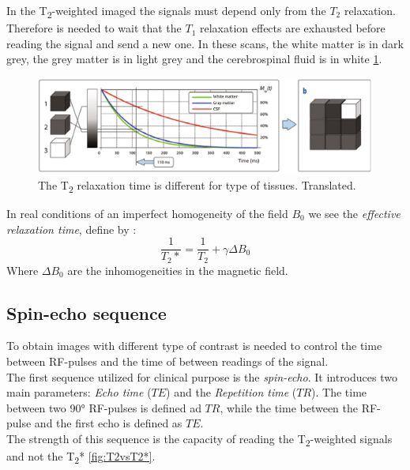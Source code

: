  In the T\textsubscript{2}-weighted imaged the signals must depend only from the $T_2$ relaxation. Therefore is needed to wait that the $T_1$ relaxation effects are exhausted before reading the signal and send a new one. In these scans, the white matter is in dark grey, the grey matter is in light grey and the cerebrospinal fluid is in white \ref{fig:T2_relax_tissues}.

 \begin{figure}[h]
    \centering
    \includegraphics[width=1\textwidth]{images/t2_relax_tissues.png}
    \caption{The T\textsubscript{2} relaxation time is different for type of tissues. \cite{elementiRisonanza} Translated.}
    \label{fig:T2_relax_tissues}
 \end{figure}

 \noindent In real conditions of an imperfect homogeneity of the field $B_0$ we see the \emph{effective relaxation time}, define by \cite{slides}:
 \begin{equation}
    \frac{1}{T_{2}*} = \frac{1}{T_2}+\gamma\Delta B_0
 \end{equation}
 Where $\Delta B_0$ are the inhomogeneities in the magnetic field.

 \subsection{Spin-echo sequence}
 To obtain images with different type of contrast is needed to control the time between RF-pulses and the time of between readings of the signal. \\
 The first sequence utilized for clinical purpose is the \emph{spin-echo}. It introduces two main parameters: \emph{Echo time} ($TE$) and the \emph{Repetition time} ($TR$). The time between two 90° RF-pulses is defined ad $TR$, while the time between the RF-pulse and the first echo is defined as $TE$.\\
 The strength of this sequence is the capacity of reading the T\textsubscript{2}-weighted signals and not the T\textsubscript{2}* \ref{fig:T2vsT2*}.

